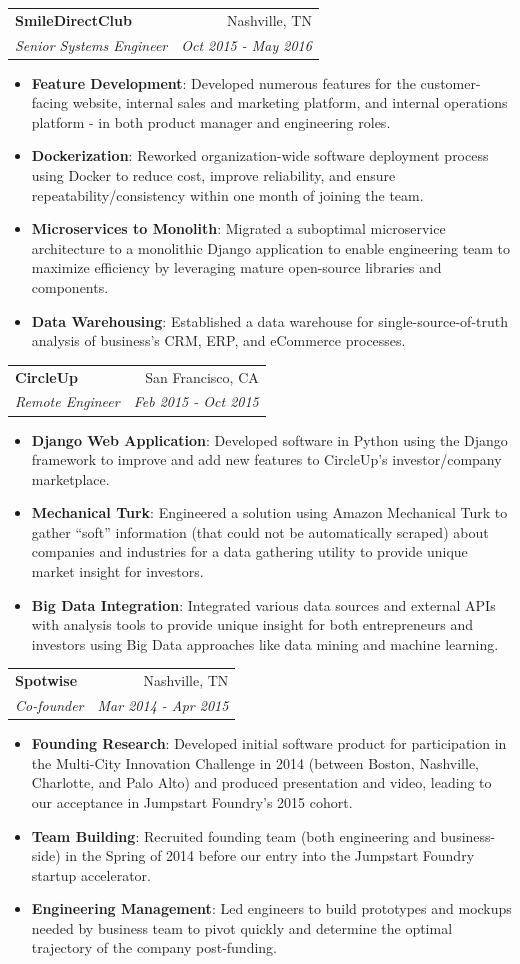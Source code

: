 \documentclass[letterpaper,10pt]{article}
\makeatletter
\newcommand{\resumeItem}[2]{
  \item\small{
    \textbf{#1}{: #2 \vspace{-2pt}}
  }
}
\newcommand{\resumeSubheading}[4]{
  \vspace{-1pt}\item
    \begin{tabular*}{0.97\textwidth}[t]{l@{\extracolsep{\fill}}r}
      \textbf{#1} & #2 \\
      \textit{\small#3} & \textit{\small #4} \\
    \end{tabular*}\vspace{-5pt}
}
\newcommand{\resumeItemListStart}{\begin{itemize}}
\newcommand{\resumeItemListEnd}{\end{itemize}\vspace{-5pt}}
\makeatother
\begin{document}
    \resumeSubheading
      {SmileDirectClub}{Nashville, TN}
      {Senior Systems Engineer}{Oct 2015 - May 2016}
      \resumeItemListStart
        \resumeItem{Feature Development}
          {Developed numerous features for the customer-facing website, internal sales and marketing platform, and internal operations platform - in both product manager and engineering roles.}
        \resumeItem{Dockerization}
          {Reworked organization-wide software deployment process using Docker to reduce cost, improve reliability, and ensure repeatability/consistency within one month of joining the team.}
        \resumeItem{Microservices to Monolith}
          {Migrated a suboptimal microservice architecture to a monolithic Django application to enable engineering team to maximize efficiency by leveraging mature open-source libraries and components.}
       \resumeItem{Data Warehousing}
          {Established a data warehouse for single-source-of-truth analysis of business's CRM, ERP, and eCommerce processes.}
      \resumeItemListEnd
      
    \resumeSubheading
      {CircleUp}{San Francisco, CA}
      {Remote Engineer}{Feb 2015 - Oct 2015}
      \resumeItemListStart
        \resumeItem{Django Web Application}
          {Developed software in Python using the Django framework to improve and add new features to CircleUp’s investor/company marketplace.}
        \resumeItem{Mechanical Turk}
          {Engineered a solution using Amazon Mechanical Turk to gather “soft” information (that could not be automatically scraped) about companies and industries for a data gathering utility to provide unique market insight for investors.}
        \resumeItem{Big Data Integration}
          {Integrated various data sources and external APIs with analysis tools to provide unique insight for both entrepreneurs and investors using Big Data approaches like data mining and machine learning.}
      \resumeItemListEnd

    \resumeSubheading
      {Spotwise}{Nashville, TN}
      {Co-founder}{Mar 2014 - Apr 2015}
      \resumeItemListStart
        \resumeItem{Founding Research}
          {Developed initial software product for participation in the Multi-City Innovation Challenge in 2014 (between Boston, Nashville, Charlotte, and Palo Alto) and produced presentation and video, leading to our acceptance in Jumpstart Foundry's 2015 cohort.}
        \resumeItem{Team Building}
          {Recruited founding team (both engineering and business-side) in the Spring of 2014 before our entry into the Jumpstart Foundry startup accelerator.}
        \resumeItem{Engineering Management}
          {Led engineers to build prototypes and mockups needed by business team to pivot quickly and determine the optimal trajectory of the company post-funding.}
      \resumeItemListEnd
\end{document}
